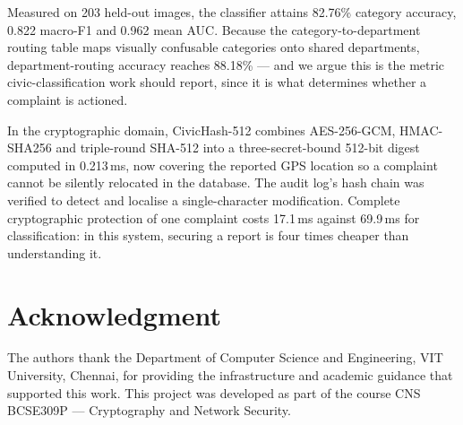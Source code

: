 \documentclass[conference]{IEEEtran}
\begin{document}
Measured on 203 held-out images, the classifier attains 82.76\% category accuracy, 0.822 macro-F1 and 0.962 mean AUC. Because the category-to-department routing table maps visually confusable categories onto shared departments, department-routing accuracy reaches 88.18\% --- and we argue this is the metric civic-classification work should report, since it is what determines whether a complaint is actioned.

In the cryptographic domain, CivicHash-512 combines AES-256-GCM, HMAC-SHA256 and triple-round SHA-512 into a three-secret-bound 512-bit digest computed in 0.213\,ms, now covering the reported GPS location so a complaint cannot be silently relocated in the database. The audit log's hash chain was verified to detect and localise a single-character modification. Complete cryptographic protection of one complaint costs 17.1\,ms against 69.9\,ms for classification: in this system, securing a report is four times cheaper than understanding it.

\section*{Acknowledgment}
The authors thank the Department of Computer Science and Engineering, VIT University, Chennai, for providing the infrastructure and academic guidance that supported this work. This project was developed as part of the course CNS BCSE309P --- Cryptography and Network Security.
\end{document}
